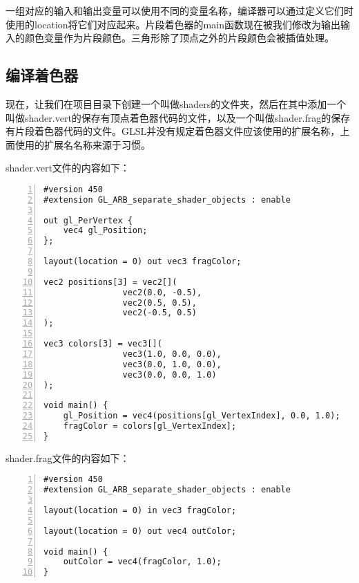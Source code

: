 \documentclass{ctexart}
\begin{document}
一组对应的输入和输出变量可以使用不同的变量名称，编译器可以通过定义它们时使用的location将它们对应起来。片段着色器的main函数现在被我们修改为输出输入的颜色变量作为片段颜色。三角形除了顶点之外的片段颜色会被插值处理。

\subsection{编译着色器}

现在，让我们在项目目录下创建一个叫做shaders的文件夹，然后在其中添加一个叫做shader.vert的保存有顶点着色器代码的文件，以及一个叫做shader.frag的保存有片段着色器代码的文件。GLSL并没有规定着色器文件应该使用的扩展名称，上面使用的扩展名名称来源于习惯。

shader.vert文件的内容如下：

\begin{lstlisting}[language={[ANSI]C},keywordstyle=\color{blue!70},commentstyle=\color{red!50!green!50!blue!50},frame=shadowbox, rulesepcolor=\color{red!20!green!20!blue!20},basicstyle=\small,numbers=left, numberstyle=\tiny,breaklines=true]
#version 450
#extension GL_ARB_separate_shader_objects : enable

out gl_PerVertex {
	vec4 gl_Position;
};

layout(location = 0) out vec3 fragColor;

vec2 positions[3] = vec2[](
				vec2(0.0, -0.5),
				vec2(0.5, 0.5),
				vec2(-0.5, 0.5)
);

vec3 colors[3] = vec3[](
				vec3(1.0, 0.0, 0.0),
				vec3(0.0, 1.0, 0.0),
				vec3(0.0, 0.0, 1.0)
);

void main() {
	gl_Position = vec4(positions[gl_VertexIndex], 0.0, 1.0);
	fragColor = colors[gl_VertexIndex];
}
\end{lstlisting}

shader.frag文件的内容如下：

\begin{lstlisting}[language={[ANSI]C},keywordstyle=\color{blue!70},commentstyle=\color{red!50!green!50!blue!50},frame=shadowbox, rulesepcolor=\color{red!20!green!20!blue!20},basicstyle=\small,numbers=left, numberstyle=\tiny,breaklines=true]
#version 450
#extension GL_ARB_separate_shader_objects : enable

layout(location = 0) in vec3 fragColor;

layout(location = 0) out vec4 outColor;

void main() {
	outColor = vec4(fragColor, 1.0);
}
\end{lstlisting}
\end{document}
